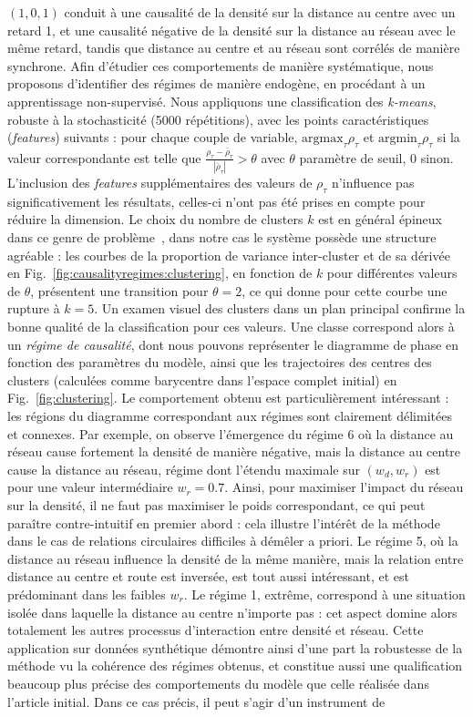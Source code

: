 $(1,0,1)$ conduit à une causalité de la densité sur la distance au centre avec un retard 1, et une causalité négative de la densité sur la distance au réseau avec le même retard, tandis que distance au centre et au réseau sont corrélés de manière synchrone. Afin d'étudier ces comportements de manière systématique, nous proposons d'identifier des régimes de manière endogène, en procédant à un apprentissage non-supervisé. Nous appliquons une classification des \emph{k-means}, robuste à la stochasticité (5000 répétitions), avec les points caractéristiques (\emph{features}) suivants : pour chaque couple de variable, $\textrm{argmax}_{\tau} \rho_{\tau}$ et $\textrm{argmin}_{\tau} \rho_{\tau}$ si la valeur correspondante est telle que $\frac{\rho_{\tau}-\bar{\rho}_{\tau}}{\left|\bar{\rho}_{\tau}\right|} > \theta$ avec $\theta$ paramètre de seuil, 0 sinon. L'inclusion des \emph{features} supplémentaires des valeurs de $\rho_{\tau}$ n'influence pas significativement les résultats, celles-ci n'ont pas été prises en compte pour réduire la dimension. Le choix du nombre de clusters $k$ est en général épineux dans ce genre de problème~\cite{hamerly2003learning}, dans notre cas le système possède une structure agréable : les courbes de la proportion de variance inter-cluster et de sa dérivée en Fig.~\ref{fig:causalityregimes:clustering}, en fonction de $k$ pour différentes valeurs de $\theta$, présentent une transition pour $\theta = 2$, ce qui donne pour cette courbe une rupture à $k=5$. Un examen visuel des clusters dans un plan principal confirme la bonne qualité de la classification pour ces valeurs. Une classe correspond alors à un \emph{régime de causalité}, dont nous pouvons représenter le diagramme de phase en fonction des paramètres du modèle, ainsi que les trajectoires des centres des clusters (calculées comme barycentre dans l'espace complet initial) en Fig.~\ref{fig:clustering}. Le comportement obtenu est particulièrement intéressant : les régions du diagramme correspondant aux régimes sont clairement délimitées et connexes. Par exemple, on observe l'émergence du régime 6 où la distance au réseau cause fortement la densité de manière négative, mais la distance au centre cause la distance au réseau, régime dont l'étendu maximale sur $(w_d,w_r)$ est pour une valeur intermédiaire $w_r=0.7$. Ainsi, pour maximiser l'impact du réseau sur la densité, il ne faut pas maximiser le poids correspondant, ce qui peut paraître contre-intuitif en premier abord : cela illustre l'intérêt de la méthode dans le cas de relations circulaires difficiles à démêler a priori. Le régime 5, où la distance au réseau influence la densité de la même manière, mais la relation entre distance au centre et route est inversée, est tout aussi intéressant, et est prédominant dans les faibles $w_r$. Le régime 1, extrême, correspond à une situation isolée dans laquelle la distance au centre n'importe pas : cet aspect domine alors totalement les autres processus d'interaction entre densité et réseau. Cette application sur données synthétique démontre ainsi d'une part la robustesse de la méthode vu la cohérence des régimes obtenus, et constitue aussi une qualification beaucoup plus précise des comportements du modèle que celle réalisée dans l'article initial. Dans ce cas précis, il peut s'agir d'un instrument de 